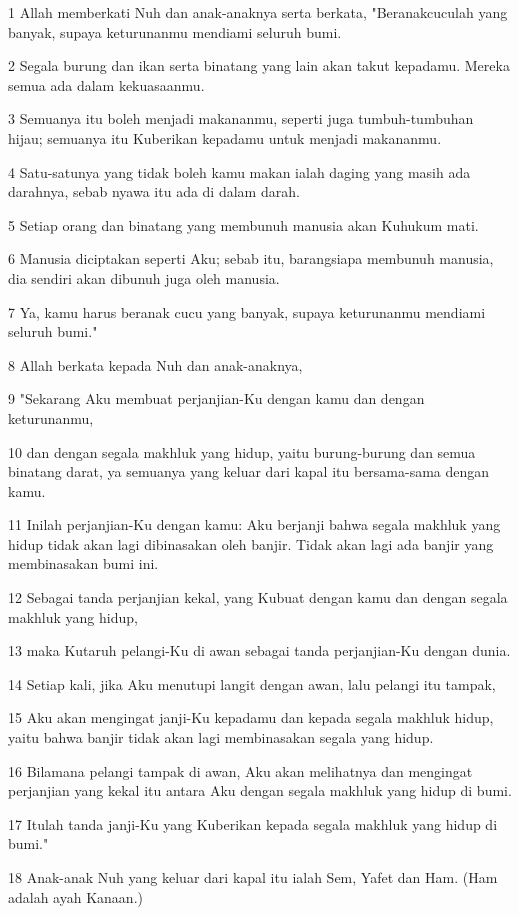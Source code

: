 \par 1 Allah memberkati Nuh dan anak-anaknya serta berkata, "Beranakcuculah yang banyak, supaya keturunanmu mendiami seluruh bumi.
\par 2 Segala burung dan ikan serta binatang yang lain akan takut kepadamu. Mereka semua ada dalam kekuasaanmu.
\par 3 Semuanya itu boleh menjadi makananmu, seperti juga tumbuh-tumbuhan hijau; semuanya itu Kuberikan kepadamu untuk menjadi makananmu.
\par 4 Satu-satunya yang tidak boleh kamu makan ialah daging yang masih ada darahnya, sebab nyawa itu ada di dalam darah.
\par 5 Setiap orang dan binatang yang membunuh manusia akan Kuhukum mati.
\par 6 Manusia diciptakan seperti Aku; sebab itu, barangsiapa membunuh manusia, dia sendiri akan dibunuh juga oleh manusia.
\par 7 Ya, kamu harus beranak cucu yang banyak, supaya keturunanmu mendiami seluruh bumi."
\par 8 Allah berkata kepada Nuh dan anak-anaknya,
\par 9 "Sekarang Aku membuat perjanjian-Ku dengan kamu dan dengan keturunanmu,
\par 10 dan dengan segala makhluk yang hidup, yaitu burung-burung dan semua binatang darat, ya semuanya yang keluar dari kapal itu bersama-sama dengan kamu.
\par 11 Inilah perjanjian-Ku dengan kamu: Aku berjanji bahwa segala makhluk yang hidup tidak akan lagi dibinasakan oleh banjir. Tidak akan lagi ada banjir yang membinasakan bumi ini.
\par 12 Sebagai tanda perjanjian kekal, yang Kubuat dengan kamu dan dengan segala makhluk yang hidup,
\par 13 maka Kutaruh pelangi-Ku di awan sebagai tanda perjanjian-Ku dengan dunia.
\par 14 Setiap kali, jika Aku menutupi langit dengan awan, lalu pelangi itu tampak,
\par 15 Aku akan mengingat janji-Ku kepadamu dan kepada segala makhluk hidup, yaitu bahwa banjir tidak akan lagi membinasakan segala yang hidup.
\par 16 Bilamana pelangi tampak di awan, Aku akan melihatnya dan mengingat perjanjian yang kekal itu antara Aku dengan segala makhluk yang hidup di bumi.
\par 17 Itulah tanda janji-Ku yang Kuberikan kepada segala makhluk yang hidup di bumi."
\par 18 Anak-anak Nuh yang keluar dari kapal itu ialah Sem, Yafet dan Ham. (Ham adalah ayah Kanaan.)
